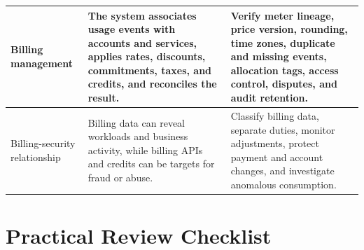 \documentclass[11pt]{article}
\begin{document}
\begin{longtable}{@{}>{\RaggedRight\arraybackslash}p{}>{\RaggedRight\arraybackslash}p{}>{\RaggedRight\arraybackslash}p{}@{}}
Billing management & The system associates usage events with accounts and services, applies rates, discounts, commitments, taxes, and credits, and reconciles the result. & Verify meter lineage, price version, rounding, time zones, duplicate and missing events, allocation tags, access control, disputes, and audit retention. \\\midrule
Billing-security relationship & Billing data can reveal workloads and business activity, while billing APIs and credits can be targets for fraud or abuse. & Classify billing data, separate duties, monitor adjustments, protect payment and account changes, and investigate anomalous consumption. \\\midrule
\bottomrule
\end{longtable}
\endgroup
\section{Practical Review Checklist}
\end{document}
